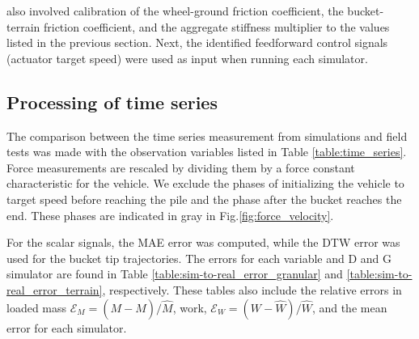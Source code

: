 \documentclass[10pt]{article}
\begin{document}
																							 
																						   
																						
also involved calibration of the wheel-ground friction coefficient, the bucket-terrain friction 
coefficient, and the aggregate stiffness multiplier to the values listed in the previous section. 
Next, the identified feedforward control signals (actuator target speed) were used as input when running
each simulator. 

\subsection{Processing of time series}
\label{sec:time series}
The comparison between the time series measurement from simulations and field tests
was made with the observation variables listed in Table \ref{table:time_series}. 
Force measurements are rescaled by dividing them by a force constant characteristic for the vehicle.
We exclude the phases of initializing the vehicle to target speed before reaching the pile and the phase after the bucket reaches the end. These phases are indicated in gray in Fig.\ref{fig:force_velocity}.

For the scalar signals, the MAE error was computed, while the DTW error was used for the bucket tip trajectories.
The errors for each variable and D and G simulator are found in Table \ref{table:sim-to-real_error_granular}
and \ref{table:sim-to-real_error_terrain}, respectively. 
These tables also include the relative errors in loaded mass $\mathcal{E}_M = (M - \hat{M})/\hat{M}$, work, $\mathcal{E}_W = (W - \hat{W})/\hat{W}$, and the mean error for each simulator.
\end{document}
